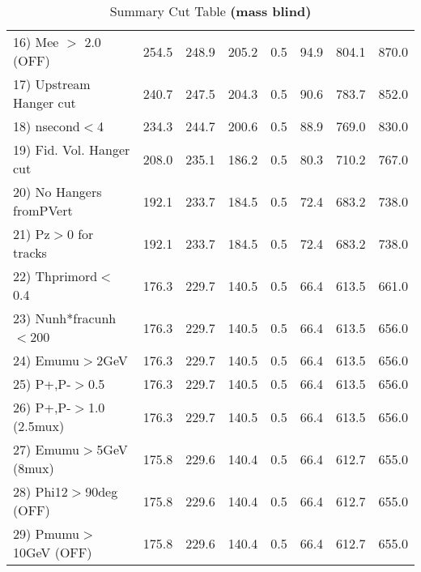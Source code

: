 \begin{table}[h!]
{{\begin{tabular}{||l||r|r|r|r|r||r||r||}
 16) Mee $>$ 2.0  (OFF)   &     254.5 &     248.9 &     205.2 &       0.5 &      94.9 &     804.1 &     870.0 \\
 17) Upstream Hanger cut  &     240.7 &     247.5 &     204.3 &       0.5 &      90.6 &     783.7 &     852.0 \\
 18) nsecond$<$4          &     234.3 &     244.7 &     200.6 &       0.5 &      88.9 &     769.0 &     830.0 \\
 19) Fid. Vol. Hanger cut &     208.0 &     235.1 &     186.2 &       0.5 &      80.3 &     710.2 &     767.0 \\
 20) No Hangers fromPVert &     192.1 &     233.7 &     184.5 &       0.5 &      72.4 &     683.2 &     738.0 \\
 21) Pz$>$0 for tracks    &     192.1 &     233.7 &     184.5 &       0.5 &      72.4 &     683.2 &     738.0 \\
 22) Thprimord$<$0.4      &     176.3 &     229.7 &     140.5 &       0.5 &      66.4 &     613.5 &     661.0 \\
 23) Nunh*fracunh$<$200   &     176.3 &     229.7 &     140.5 &       0.5 &      66.4 &     613.5 &     656.0 \\
 24) Emumu$>$2GeV         &     176.3 &     229.7 &     140.5 &       0.5 &      66.4 &     613.5 &     656.0 \\
 25) P+,P-$>$0.5          &     176.3 &     229.7 &     140.5 &       0.5 &      66.4 &     613.5 &     656.0 \\
 26) P+,P-$>$1.0 (2.5mux) &     176.3 &     229.7 &     140.5 &       0.5 &      66.4 &     613.5 &     656.0 \\
 27) Emumu$>$5GeV  (8mux) &     175.8 &     229.6 &     140.4 &       0.5 &      66.4 &     612.7 &     655.0 \\
 28) Phi12$>$90deg  (OFF) &     175.8 &     229.6 &     140.4 &       0.5 &      66.4 &     612.7 &     655.0 \\
 29) Pmumu$>$10GeV  (OFF) &     175.8 &     229.6 &     140.4 &       0.5 &      66.4 &     612.7 &     655.0 \\
 \hline
 \hline
 \end{tabular}
 \caption{Summary Cut Table \textbf{ (mass blind)}}
 \label{tab-sumcut}
 }}
 \end{table}
 \endinput
